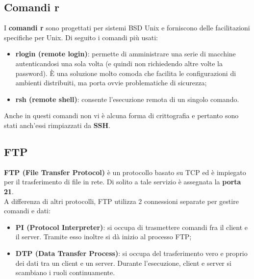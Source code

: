     \subsection{Comandi r}

        I \textbf{comandi r} sono progettati per sistemi BSD Unix e forniscono delle facilitazioni specifiche per Unix.
        Di seguito i comandi più usati:

        \begin{itemize}
            \item \textbf{rlogin (remote login)}: permette di amministrare una serie di macchine autenticandosi
            una sola volta (e quindi non richiedendo altre volte la password). È una soluzione molto
            comoda che facilita le configurazioni di ambienti distribuiti, ma porta ovvie
            problematiche di sicurezza;
            
            \item \textbf{rsh (remote shell)}: consente l’esecuzione remota di un singolo comando.
        \end{itemize}

        Anche in questi comandi non vi è alcuna forma di crittografia e pertanto sono stati anch’essi rimpiazzati da \textbf{SSH}.

    \subsection{FTP}        
        \textbf{FTP (File Transfer Protocol)} è un protocollo basato su TCP ed è impiegato per il trasferimento 
        di file in rete. Di solito a tale servizio è assegnata la \textbf{porta 21}.\\

        A differenza di altri protocolli, FTP utilizza 2 connessioni separate per gestire comandi e dati:

        \begin{itemize}
            \item \textbf{PI (Protocol Interpreter)}: si occupa di trasmettere comandi fra il client e il server.
            Tramite esso inoltre si dà inizio al processo FTP;
            \item \textbf{DTP (Data Transfer Process)}: si occupa del trasferimento vero e proprio dei dati tra un
            client e un server. Durante l’esecuzione, client e server si scambiano i ruoli
            continuamente.
        \end{itemize}

